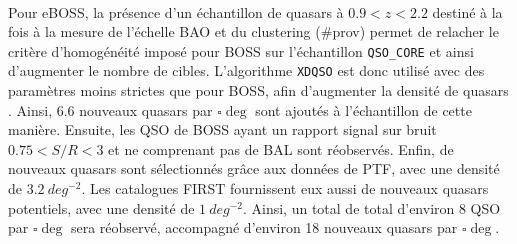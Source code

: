 

\paragraph{} Pour eBOSS, la présence d'un échantillon de quasars à $\num{0,9} < z < \num{2,2}$ destiné à la fois à la mesure de l'échelle BAO et du clustering (\#prov) permet de relacher le critère d'homogénéité imposé pour BOSS sur l'échantillon \texttt{QSO\_CORE} et ainsi d'augmenter le nombre de cibles.
L'algorithme \texttt{XDQSO} est donc utilisé avec des paramètres moins strictes que pour BOSS, afin d'augmenter la densité de quasars \lya{}.
Ainsi, \num{6,6} nouveaux quasars par $\si{\square\deg}$ sont ajoutés à l'échantillon de cette manière.
Ensuite, les QSO de BOSS ayant un rapport signal sur bruit $\num{0,75} < S/R < \num{3}$ et ne comprenant pas de BAL sont réobservés.
Enfin, de nouveaux quasars sont sélectionnés gr\^ace aux données de PTF, avec une densité de $\SI{3,2}{deg^{-2}}$. Les catalogues FIRST fournissent eux aussi de nouveaux quasars potentiels, avec une densité de $\SI{1}{deg^{-2}}$.
Ainsi, un total de total d'environ 8 QSO par $\si{\square\deg}$ sera réobservé, accompagné d'environ 18 nouveaux quasars par $\si{\square\deg}$.




